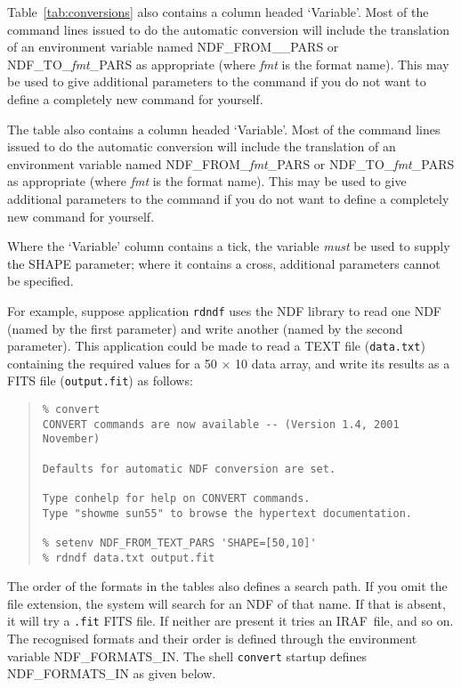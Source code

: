 \documentclass[twoside,11pt]{article}
\newcommand{\htmladdnormallink}[2]{#1}
\newenvironment{latexonly}{}{}
\newcommand{\IRAF}{{\footnotesize IRAF}}
\newcommand{\IRAFURL}{http://star-www.rl.ac.uk/iraf/web/iraf-homepage.html}
\newcommand{\IRAFref}{\htmladdnormallink{\IRAF}{\IRAFURL}}
\begin{document}
\begin{latexonly}
Table~\ref{tab:conversions} also contains a column headed `Variable'.
Most of the command lines issued to do the automatic conversion will include 
the translation of an environment variable named 
NDF\_FROM\_\_\-PARS or NDF\_TO\_{\em fmt}\_PARS as appropriate
(where {\em fmt} is the format name).
This may be used to give additional parameters to the command if you do not
want to define a completely new command for yourself. 
\end{latexonly}
\begin{htmlonly}
The table also contains a column headed `Variable'.
Most of the command lines issued to do the automatic conversion will include 
the translation of an environment variable named NDF\_FROM\_{\em fmt}\_PARS or 
NDF\_TO\_{\em fmt}\_PARS as appropriate (where {\em fmt} is the format name).
This may be used to give additional parameters to the command if you do not
want to define a completely new command for yourself. 
\end{htmlonly}
Where the `Variable' column contains a tick, the variable {\em must} be used 
to supply the SHAPE parameter; where it contains a cross, additional parameters
cannot be specified.

For example, suppose application \texttt{rdndf} uses the NDF library to read
one NDF (named by the first parameter) and write another (named by the second
parameter). This application could be made to read a TEXT file 
(\texttt{data.txt})
containing the required values for a 50 $\times$ 10 data array, and write its 
results as a FITS file (\texttt{output.fit}) as follows:

\small
\begin{quote} \begin{verbatim}
% convert
CONVERT commands are now available -- (Version 1.4, 2001 November)

Defaults for automatic NDF conversion are set.

Type conhelp for help on CONVERT commands.
Type "showme sun55" to browse the hypertext documentation.

% setenv NDF_FROM_TEXT_PARS 'SHAPE=[50,10]'
% rdndf data.txt output.fit
\end{verbatim} \end{quote}
\normalsize
\bigskip

The order of the formats in the tables also defines a search path.  If
you omit the file extension, the system will search for an NDF of that
name.  If that is absent, it will try a \texttt{.fit} FITS file.  If neither
are present it tries an \IRAFref\ file, and so on. The recognised formats and
their order is defined through the environment variable
NDF\_FORMATS\_IN.  The shell \texttt{convert} startup defines
NDF\_FORMATS\_IN as given below.
\end{document}
